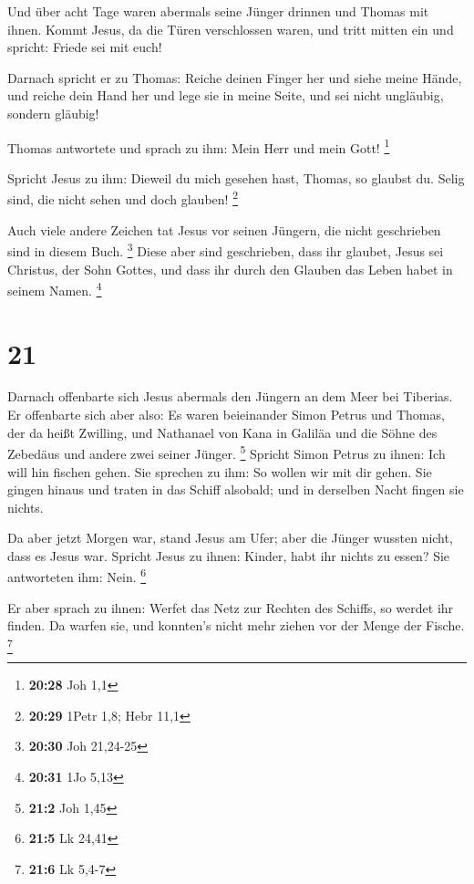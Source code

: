  Und über acht Tage waren abermals seine Jünger drinnen
und Thomas mit ihnen. Kommt Jesus, da die Türen verschlossen waren, und
tritt mitten ein und spricht: Friede sei mit euch!

 Darnach spricht er zu Thomas: Reiche deinen Finger her
und siehe meine Hände, und reiche dein Hand her und lege sie in meine
Seite, und sei nicht ungläubig, sondern gläubig!

 Thomas antwortete und sprach zu ihm: Mein Herr und mein
Gott! \footnote{\textbf{20:28} Joh 1,1}

 Spricht Jesus zu ihm: Dieweil du mich gesehen hast,
Thomas, so glaubst du. Selig sind, die nicht sehen und doch glauben!
\footnote{\textbf{20:29} 1Petr 1,8; Hebr 11,1}

 Auch viele andere Zeichen tat Jesus vor seinen Jüngern,
die nicht geschrieben sind in diesem Buch. \footnote{\textbf{20:30} Joh
  21,24-25}  Diese aber sind geschrieben, dass ihr
glaubet, Jesus sei Christus, der Sohn Gottes, und dass ihr durch den
Glauben das Leben habet in seinem Namen. \footnote{\textbf{20:31} 1Jo
  5,13}

\hypertarget{section-8}{%
\section{21}\label{section-8}}

 Darnach offenbarte sich Jesus abermals den Jüngern an dem
Meer bei Tiberias. Er offenbarte sich aber also:  Es waren
beieinander Simon Petrus und Thomas, der da heißt Zwilling, und
Nathanael von Kana in Galiläa und die Söhne des Zebedäus und andere zwei
seiner Jünger. \footnote{\textbf{21:2} Joh 1,45}  Spricht
Simon Petrus zu ihnen: Ich will hin fischen gehen. Sie sprechen zu ihm:
So wollen wir mit dir gehen. Sie gingen hinaus und traten in das Schiff
alsobald; und in derselben Nacht fingen sie nichts.

 Da aber jetzt Morgen war, stand Jesus am Ufer; aber die
Jünger wussten nicht, dass es Jesus war.  Spricht Jesus zu
ihnen: Kinder, habt ihr nichts zu essen? Sie antworteten ihm: Nein.
\footnote{\textbf{21:5} Lk 24,41}

 Er aber sprach zu ihnen: Werfet das Netz zur Rechten des
Schiffs, so werdet ihr finden. Da warfen sie, und konnten's nicht mehr
ziehen vor der Menge der Fische. \footnote{\textbf{21:6} Lk 5,4-7}

